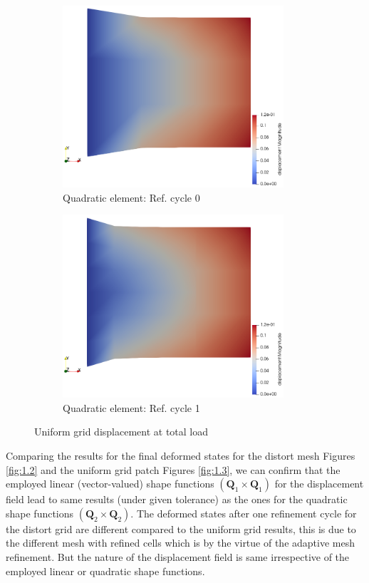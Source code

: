 \documentclass[11pt,a4paper,final]{article}
\begin{document}
\begin{figure}[h!]
\begin{subfigure}[b]{0.35\textwidth}
\includegraphics[width=0.9\textwidth]{patch_uniform_grid_ref_0_quad.png}
\caption{Quadratic element: Ref. cycle 0}
\label{fig:1.3.3}
\end{subfigure}
\begin{subfigure}[b]{0.35\textwidth}
\centering
\includegraphics[width=0.9\textwidth]{patch_uniform_grid_ref_1_quad.png}
\caption{Quadratic element: Ref. cycle 1}
\label{fig:1.3.4}
\end{subfigure}
\caption{Uniform grid displacement at total load}
\label{fig:1.3}
\end{figure}

Comparing the results for the final deformed states for the distort mesh Figures \eqref{fig:1.2} and the uniform grid patch Figures \eqref{fig:1.3}, we can confirm that the employed linear (vector-valued) shape functions $(\mathbf{Q}_1 \times \mathbf{Q}_1)$ for the displacement field lead to same results (under given tolerance) as the ones for the quadratic shape functions $(\mathbf{Q}_2 \times \mathbf{Q}_2)$. The deformed states after one refinement cycle for the distort grid are different compared to the uniform grid results, this is due to the different mesh with refined cells which is by the virtue of the adaptive mesh refinement. But the nature of the displacement field is same irrespective of the employed linear or quadratic shape functions. \par 
\end{document}
